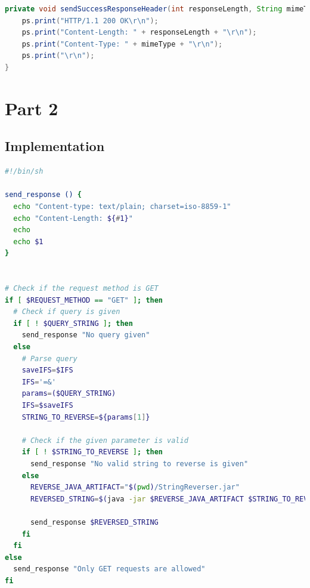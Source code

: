 \documentclass{article}
\begin{document}
\begin{lstlisting}[label=lst:01_part1_impl_tinyhttpd_sendSuccessResponseHeader, caption=CLI command to start a GitLab runner in a Docker container, language=java, numbers=none]
private void sendSuccessResponseHeader(int responseLength, String mimeType) {
    ps.print("HTTP/1.1 200 OK\r\n");
    ps.print("Content-Length: " + responseLength + "\r\n");
    ps.print("Content-Type: " + mimeType + "\r\n");
    ps.print("\r\n");
}
\end{lstlisting}

\section{Part 2}

\subsection{Implementation}

\begin{lstlisting}[label=lst:02_part2_impl_script, caption=CLI command to start a GitLab runner in a Docker container, language=bash, numbers=none]
#!/bin/sh

send_response () {
  echo "Content-type: text/plain; charset=iso-8859-1"
  echo "Content-Length: ${#1}"
  echo
  echo $1
}


# Check if the request method is GET
if [ $REQUEST_METHOD == "GET" ]; then
  # Check if query is given
  if [ ! $QUERY_STRING ]; then
    send_response "No query given"
  else
    # Parse query
    saveIFS=$IFS
    IFS='=&'
    params=($QUERY_STRING)
    IFS=$saveIFS
    STRING_TO_REVERSE=${params[1]}

    # Check if the given parameter is valid
    if [ ! $STRING_TO_REVERSE ]; then
      send_response "No valid string to reverse is given"
    else
      REVERSE_JAVA_ARTIFACT="$(pwd)/StringReverser.jar"
      REVERSED_STRING=$(java -jar $REVERSE_JAVA_ARTIFACT $STRING_TO_REVERSE)

      send_response $REVERSED_STRING
    fi
  fi
else
  send_response "Only GET requests are allowed"
fi

\end{lstlisting}
\end{document}
